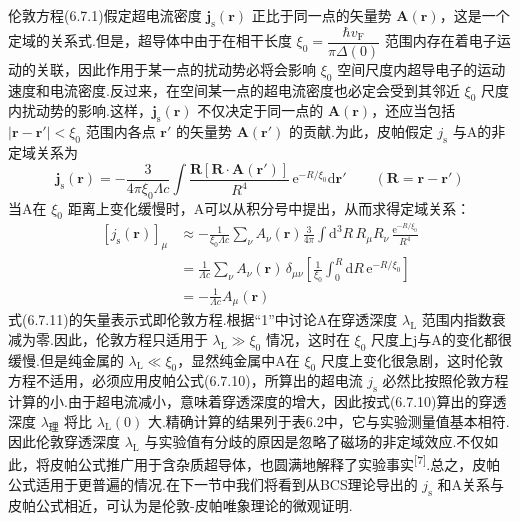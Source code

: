 伦敦方程(6.7.1)假定超电流密度 $\boldsymbol{j}_{\mathrm{s}}(\boldsymbol{r})$ 正比于同一点的矢量势 $\boldsymbol{A}(\boldsymbol{r})$，这是一个定域的关系式.但是，超导体中由于在相干长度 $\xi_{0}=\dfrac{\hbar v_{\mathrm{F}}}{\pi\Delta(0)}$ 范围内存在着电子运动的关联，因此作用于某一点的扰动势必将会影响 $\xi_{0}$ 空间尺度内超导电子的运动速度和电流密度.反过来，在空间某一点的超电流密度也必定会受到其邻近 $\xi_{0}$ 尺度内扰动势的影响.这样，$\boldsymbol{j}_{\mathrm{s}}(\boldsymbol{r})$ 不仅决定于同一点的 $\boldsymbol{A}(\boldsymbol{r})$，还应当包括 $|\boldsymbol{r}-\boldsymbol{r}'|<\xi_{0}$ 范围内各点 $\boldsymbol{r}'$ 的矢量势 $\boldsymbol{A}(\boldsymbol{r}')$ 的贡献.为此，皮帕假定 $j_{\mathrm{s}}$ 与A的非定域关系为
\begin{equation}
  \boldsymbol{j}_{\mathrm{s}}(\boldsymbol{r})
  =-\frac{3}{4\pi\xi_{0}\Lambda c}
  \int\frac{\boldsymbol{R}\left[\boldsymbol{R}\cdot\boldsymbol{A}(\boldsymbol{r}')\right]}
  {R^{4}}\,\mathrm{e}^{-R/\xi_{0}}\mathrm{d}\boldsymbol{r}'
  \qquad\left(\boldsymbol{R}=\boldsymbol{r}-\boldsymbol{r}'\right)
\end{equation}
当A在 $\xi_{0}$ 距离上变化缓慢时，A可以从积分号中提出，从而求得定域关系：
\begin{equation}
\begin{aligned}
  \left[j_{\mathrm{s}}(\boldsymbol{r})\right]_{\mu}
  &\approx-\frac{1}{\xi_{0}\Lambda c}\sum_{\nu}A_{\nu}(\boldsymbol{r})
  \frac{3}{4\pi}\int\mathrm{d}^{3}R\,R_{\mu}R_{\nu}\,
  \frac{\mathrm{e}^{-R/\xi_{0}}}{R^{4}}\\
  &=\frac{1}{\Lambda c}\sum_{\nu}A_{\nu}(\boldsymbol{r})\,\delta_{\mu\nu}
  \left[\frac{1}{\xi_{0}}\int_{0}^{R}\mathrm{d}R\,\mathrm{e}^{-R/\xi_{0}}\right]\\
  &=-\frac{1}{\Lambda c}A_{\mu}(\boldsymbol{r})
\end{aligned}
\end{equation}
式(6.7.11)的矢量表示式即伦敦方程.根据“1”中讨论A在穿透深度 $\lambda_{\mathrm{L}}$ 范围内指数衰减为零.因此，伦敦方程只适用于 $\lambda_{\mathrm{L}}\gg\xi_{0}$ 情况，这时在 $\xi_{0}$ 尺度上j与A的变化都很缓慢.但是纯金属的 $\lambda_{\mathrm{L}}\ll\xi_{0}$，显然纯金属中A在 $\xi_{0}$ 尺度上变化很急剧，这时伦敦方程不适用，必须应用皮帕公式(6.7.10)，所算出的超电流 $j_{\mathrm{s}}$ 必然比按照伦敦方程计算的小.由于超电流减小，意味着穿透深度的增大，因此按式(6.7.10)算出的穿透深度 $\lambda_{\text{理}}$ 将比 $\lambda_{\mathrm{L}}(0)$ 大.精确计算的结果列于表6.2中，它与实验测量值基本相符.因此伦敦穿透深度 $\lambda_{\mathrm{L}}$ 与实验值有分歧的原因是忽略了磁场的非定域效应.不仅如此，将皮帕公式推广用于含杂质超导体，也圆满地解释了实验事实\textsuperscript{[7]}.总之，皮帕公式适用于更普遍的情况.在下一节中我们将看到从BCS理论导出的 $j_{\mathrm{s}}$ 和A关系与皮帕公式相近，可认为是伦敦-皮帕唯象理论的微观证明.

